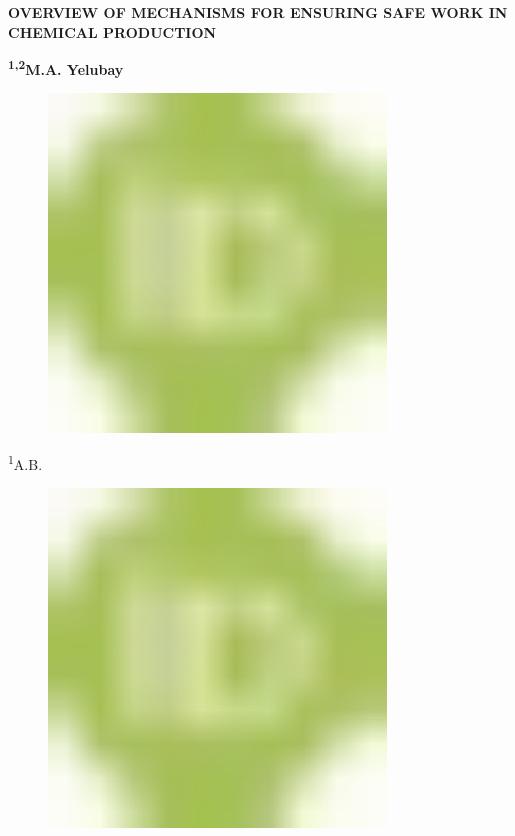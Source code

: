 
{\bfseries OVERVIEW OF MECHANISMS FOR ENSURING SAFE WORK IN CHEMICAL
PRODUCTION}

{\bfseries \textsuperscript{1,2}M.A. Yelubay}
\begin{figure}[H]
	\centering
	\includegraphics[width=0.8\textwidth]{media/chem2/image1}
	\caption*{}
\end{figure}

\textsuperscript{1}A.B.
\begin{figure}[H]
	\centering
	\includegraphics[width=0.8\textwidth]{media/chem2/image1}
	\caption*{}
\end{figure}

